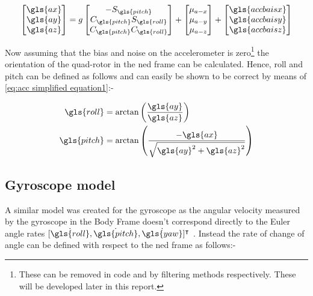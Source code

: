 \begin{equation}
	\begin{bmatrix}
		\gls{ax} \\ \gls{ay} \\\gls{az}
	\end{bmatrix}
	= 
	g
	\begin{bmatrix}
		-S_{\gls{pitch}} \\ C_{\gls{pitch}}S_{\gls{roll}}\\C_{\gls{pitch}}C_{\gls{roll}} 
	\end{bmatrix}
	+
	\begin{bmatrix}
		\mu_{a-x} \\ \mu_{a-y}\\\mu_{a-z}
	\end{bmatrix}
	+
	\begin{bmatrix}
		\gls{accbaisx} \\ \gls{accbaisy}\\\gls{accbaisz}
	\end{bmatrix}
	\label{eq:acc simplified equation1}
\end{equation}





Now assuming that the bias and noise on the accelerometer is zero\footnote{These can be removed in code and by filtering methods respectively. These will be developed later in this report.} the orientation of the quad-rotor in the \gls{ned} frame can be calculated. Hence, \gls{roll} and \gls{pitch} can be defined as follows and can easily be shown to be correct by means of \eqref{eq:acc simplified equation1}:-

\begin{align}
	\begin{split}
		\gls{roll} &= \arctan\left(\frac{\gls{ay}}{\gls{az}}\right)\\
		\gls{pitch} &= \arctan \left(\frac{- \gls{ax}}{\sqrt{\gls{ay}^2+\gls{az}^2}}\right)
		\label{Eq: angles from acc1}
	\end{split}
\end{align}

\subsection{Gyroscope model} \label{sec: gyroscope sec}
A similar model was created for the gyroscope as the angular velocity measured by the gyroscope in the Body Frame doesn't correspond directly to the Euler angle rates $[\dot{\gls{roll}},\dot{\gls{pitch}},\dot{\gls{yaw}}]^\intercal$ . Instead the rate of change of angle can be defined with respect to the \gls{ned} frame as follows:-


